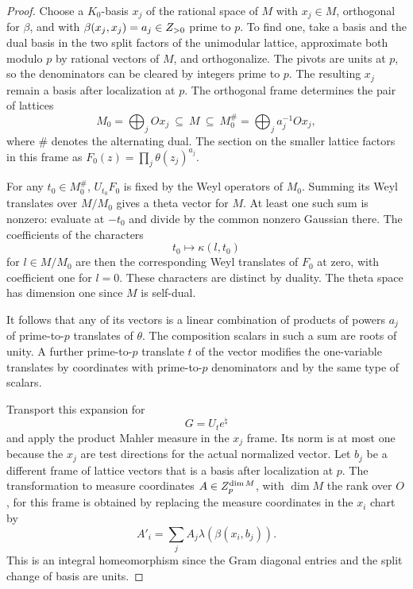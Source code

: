 \begin{proof}
Choose a \(K_0\)-basis \(x_j\) of the rational space of \(M\)
with \(x_j\in M\), orthogonal for \(\beta\), and with
\(\beta(x_j,x_j)=a_j\in Z_{>0}\) prime to \(p\).
To find one, take a basis and the dual basis in the two
split factors of the unimodular lattice, approximate
both modulo \(p\) by rational vectors of \(M\), and
orthogonalize. The pivots are units at \(p\), so the
denominators can be cleared by integers prime to \(p\).
The resulting \(x_j\) remain a basis after localization
at \(p\). The orthogonal frame determines the pair of lattices
\[
 M_0=\bigoplus_j O x_j\ \subseteq\ M\ \subseteq\ M_0^\#
        =\bigoplus_j a_j^{-1}O x_j ,
\]
where \(\#\) denotes the alternating dual. The section on the smaller
lattice factors in this frame as \(F_0(z)=\prod_j\theta(z_j)^{a_j}\).

For any \(t_0\in M_0^\#\),
\(U_{t_0}F_0\) is fixed by the Weyl operators of \(M_0\).
Summing its Weyl translates over \(M/M_0\) gives a theta
vector for \(M\). At least one such sum is nonzero:
evaluate at \(-t_0\) and divide by the common
nonzero Gaussian there. The coefficients of the
characters 
\[
  t_0\mapsto\kappa(l,t_0)
\]
 for \(l\in M/M_0\)
are then the corresponding Weyl translates of \(F_0\) at
zero, with coefficient one for \(l=0\).
These characters are distinct by duality. The theta
space has dimension one since \(M\) is self-dual.

It follows that any of its vectors is a linear
combination of products of powers \(a_j\) of
prime-to-\(p\) translates of \(\theta\). The composition
scalars in such a sum are roots of unity. A further
prime-to-\(p\) translate \(t\) of the vector modifies
the one-variable translates by coordinates with
prime-to-\(p\) denominators and by the same type of
scalars.

Transport this expansion for 
\[
  G=U_t e^\natural
\]
 and
apply the product Mahler measure in the \(x_j\) frame.
Its norm is at most one because the \(x_j\) are test
directions for the actual normalized vector. Let
\(b_j\) be a different frame of lattice vectors that
is a basis after localization at \(p\). The transformation
to measure coordinates \(A\in Z_p^{\dim M}\), with
\(\dim M\) the rank over \(O\), for this
frame is obtained by replacing the measure coordinates
in the \(x_i\) chart by
\[
                  A'_i=\sum_j A_j\lambda(\beta(x_i,b_j)).
\tag{M3}\label{eq:tag-m3}
\]
This is an integral homeomorphism since the Gram
diagonal entries and the split change of basis are
units.


\end{proof}
